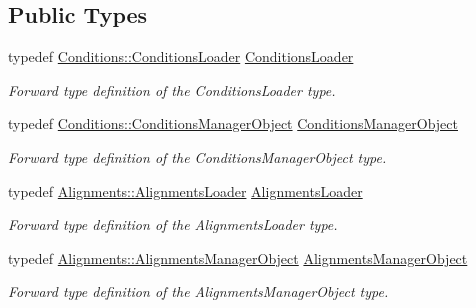 \subsection*{Public Types}
\begin{DoxyCompactItemize}
\item 
typedef \hyperlink{class_d_d4hep_1_1_conditions_1_1_conditions_loader}{Conditions\+::\+Conditions\+Loader} \hyperlink{class_d_d4hep_1_1_geometry_1_1_world_object_ab3186f89db27a386504504645203d688}{Conditions\+Loader}
\begin{DoxyCompactList}\small\item\em Forward type definition of the Conditions\+Loader type. \end{DoxyCompactList}\item 
typedef \hyperlink{class_d_d4hep_1_1_conditions_1_1_conditions_manager_object}{Conditions\+::\+Conditions\+Manager\+Object} \hyperlink{class_d_d4hep_1_1_geometry_1_1_world_object_a96576e6e392fe72924c1135cc8907aec}{Conditions\+Manager\+Object}
\begin{DoxyCompactList}\small\item\em Forward type definition of the Conditions\+Manager\+Object type. \end{DoxyCompactList}\item 
typedef \hyperlink{class_d_d4hep_1_1_alignments_1_1_alignments_loader}{Alignments\+::\+Alignments\+Loader} \hyperlink{class_d_d4hep_1_1_geometry_1_1_world_object_a30113114fd4d57fb10e2c39c484813c3}{Alignments\+Loader}
\begin{DoxyCompactList}\small\item\em Forward type definition of the Alignments\+Loader type. \end{DoxyCompactList}\item 
typedef \hyperlink{class_d_d4hep_1_1_alignments_1_1_alignments_manager_object}{Alignments\+::\+Alignments\+Manager\+Object} \hyperlink{class_d_d4hep_1_1_geometry_1_1_world_object_ac5c3ed360e547df41b814ee0c5fddf9f}{Alignments\+Manager\+Object}
\begin{DoxyCompactList}\small\item\em Forward type definition of the Alignments\+Manager\+Object type. \end{DoxyCompactList}\end{DoxyCompactItemize}

